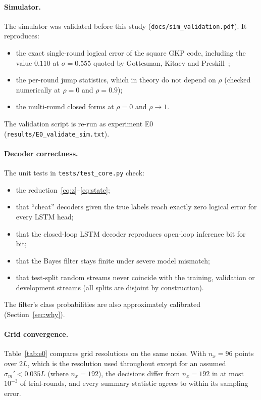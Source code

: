 \documentclass[11pt,letterpaper]{article}
\begin{document}
\paragraph{Simulator.} The simulator was validated before this study
(\texttt{docs/sim\_validation.pdf}). It reproduces:
\begin{itemize}
  \item the exact single-round logical error of the square GKP code,
    including the value $0.110$ at $\sigma=0.555$ quoted by
    Gottesman, Kitaev and Preskill~\cite{gkp};
  \item the per-round jump statistics, which in theory do not depend on
    $\rho$ (checked numerically at $\rho=0$ and $\rho=0.9$);
  \item the multi-round closed forms at $\rho=0$ and $\rho\to1$.
\end{itemize}
The validation script is re-run as experiment E0
(\texttt{results/E0\_validate\_sim.txt}).

\paragraph{Decoder correctness.} The unit tests in \texttt{tests/test\_core.py}
check:
\begin{itemize}
  \item the reduction~\eqref{eq:z}--\eqref{eq:state};
  \item that ``cheat'' decoders given the true labels reach exactly zero
    logical error for every LSTM head;
  \item that the closed-loop LSTM decoder reproduces open-loop inference bit
    for bit;
  \item that the Bayes filter stays finite under severe model mismatch;
  \item that test-split random streams never coincide with the training,
    validation or development streams (all splits are disjoint by
    construction).
\end{itemize}
The filter's class probabilities are also approximately calibrated
(Section~\ref{sec:why}).

\paragraph{Grid convergence.} Table~\ref{tab:e0} compares grid resolutions on
the same noise. With $n_x=96$ points over $2L$, which is the resolution used
throughout except for an assumed $\sigma_m'<0.035L$ (where $n_x=192$), the
decisions differ from $n_x=192$ in at most $10^{-3}$ of trial-rounds, and
every summary statistic agrees to within its sampling error.
\end{document}
